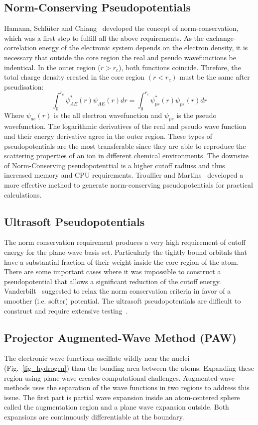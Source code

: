 \subsection{Norm-Conserving Pseudopotentials}
Hamann, Schl\"uter and Chiang~\cite{hamann1979norm} developed the concept of norm-conservation, which was a first step to fulfill all the above requirements. As the exchange-correlation energy of the electronic system depends on the electron density, it is necessary that outside the core region the real and pseudo wavefunctions be indentical. In the outer region ($r > r_c$), both functions coincide. Threfore, the total charge density created in the core region $(r < r_c)$ must be the same after pseudisation:
\begin{equation}
\int^{r_{c}}_0 \psi^{\ast}_{AE}(r)\psi_{AE}(r)dr = \int^{r_c}_0 \psi^{\ast}_{ps}(r)\psi_{ps}(r)dr
\end{equation}
Where $\psi_{ae}(r)$ is the all electron wavefunction and $\psi_{ps}$ is the pseudo wavefunction. The logarithmic derivatives of the real and pseudo wave function and their energy derivative agree in the outer region. These types of pseudopotentials are the most transferable since they are able to reproduce the scattering properties of an ion in different chemical environments\cite{hamann1979norm}. The downsize of Norm-Conserving pseudopotenttial is a higher cutoff radiuss and thus increased memory and CPU requirements. Troullier and Martins~\cite{troullier1991efficient} developed a more effective method to generate norm-conserving pseudopotentials for practical calculations. 

\subsection{Ultrasoft Pseudopotentials}
The norm conservation requirement produces a very high requirement of cutoff energy for the plane-wave basis set. Particularly the tightly bound orbitals that have a substantial fraction of their weight inside the core region of the atom. There are some important cases where it was impossible to construct a pseudopotential that allows a significant reduction of the cutoff energy. Vanderbilt~\cite{vanderbilt1990soft} suggested to relax the norm conservation criteria in favor of a smoother (i.e. softer) potential. The ultrasoft pseudopotentials are difficult to construct and require extensive testing~\cite{kresse1999ultrasoft}.

\subsection{Projector Augmented-Wave Method (PAW)}
The electronic wave functions oscillate wildly near the nuclei (Fig.~\ref{fig_hydrogen}) than the bonding area between the atoms. Expanding these region using plane-wave creates computational challenges. Augmented-wave methods uses the separation of the wave functions in two regions to address this issue. The first part is partial wave expansion inside an atom-centered sphere called the augmentation region and a plane wave expansion outside. Both expansions are continuously differentiable at the boundary.


